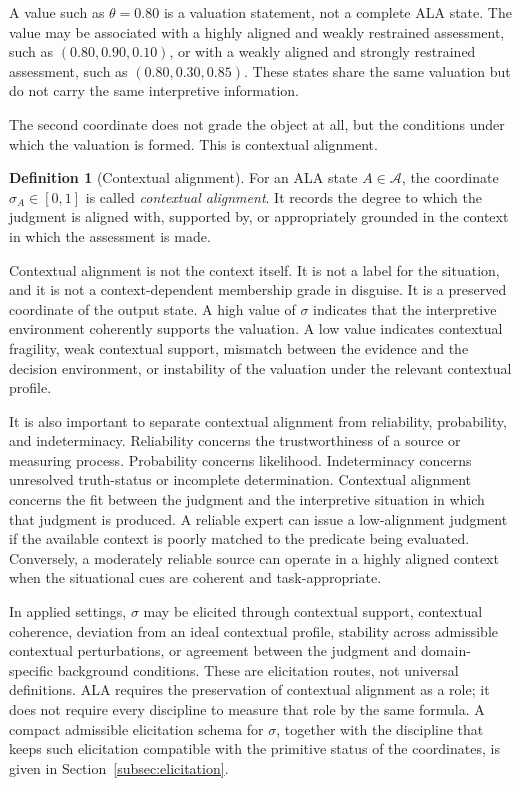 \documentclass[reqno,final]{amsart}
\theoremstyle{definition}
\newtheorem{definition}{Definition}
\theoremstyle{plain}
\theoremstyle{remark}
\providecommand{\cA}{\mathcal{A}}
\begin{document}
A value such as \(\theta=0.80\) is a valuation statement, not a complete ALA state. The value may be associated with a highly aligned and weakly restrained assessment, such as \((0.80,0.90,0.10)\), or with a weakly aligned and strongly restrained assessment, such as \((0.80,0.30,0.85)\). These states share the same valuation but do not carry the same interpretive information.

The second coordinate does not grade the object at all, but the conditions under which the valuation is formed. This is contextual alignment.

\begin{definition}[Contextual alignment]
For an ALA state \(A\in\cA\), the coordinate \(\sigma_A\in[0,1]\) is called \emph{contextual alignment}. It records the degree to which the judgment is aligned with, supported by, or appropriately grounded in the context in which the assessment is made.
\end{definition}

Contextual alignment is not the context itself. It is not a label for the situation, and it is not a context-dependent membership grade in disguise. It is a preserved coordinate of the output state. A high value of \(\sigma\) indicates that the interpretive environment coherently supports the valuation. A low value indicates contextual fragility, weak contextual support, mismatch between the evidence and the decision environment, or instability of the valuation under the relevant contextual profile.

It is also important to separate contextual alignment from reliability, probability, and indeterminacy. Reliability concerns the trustworthiness of a source or measuring process. Probability concerns likelihood. Indeterminacy concerns unresolved truth-status or incomplete determination. Contextual alignment concerns the fit between the judgment and the interpretive situation in which that judgment is produced. A reliable expert can issue a low-alignment judgment if the available context is poorly matched to the predicate being evaluated. Conversely, a moderately reliable source can operate in a highly aligned context when the situational cues are coherent and task-appropriate.

In applied settings, \(\sigma\) may be elicited through contextual support, contextual coherence, deviation from an ideal contextual profile, stability across admissible contextual perturbations, or agreement between the judgment and domain-specific background conditions. These are elicitation routes, not universal definitions. ALA requires the preservation of contextual alignment as a role; it does not require every discipline to measure that role by the same formula. A compact admissible elicitation schema for \(\sigma\), together with the discipline that keeps such elicitation compatible with the primitive status of the coordinates, is given in Section~\ref{subsec:elicitation}.
\end{document}
